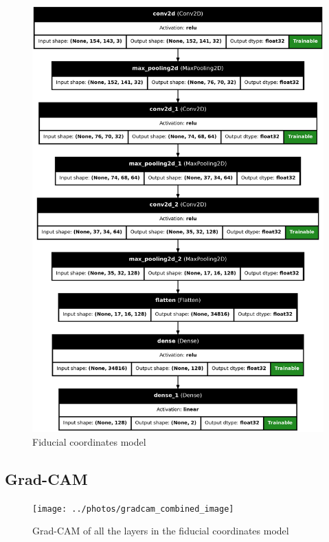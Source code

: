 \begin{figure}[H]
    \centering
    \includegraphics[height=.8\paperheight]{../photos/fiducial_coords_model}
    \caption[originalRainbow]{Fiducial coordinates model}
    \label{fig:fiducial_coords_model}
\end{figure}
\newpage

\subsection{Grad-CAM}\label{subsec:gradcam}
\begin{figure}[h!]
    \centering
    \texttt{[image: ../photos/gradcam\_combined\_image]}
    \caption[originalRainbow]{Grad-CAM of all the layers in the fiducial coordinates model}
    \label{fig:gradcam}
\end{figure}


